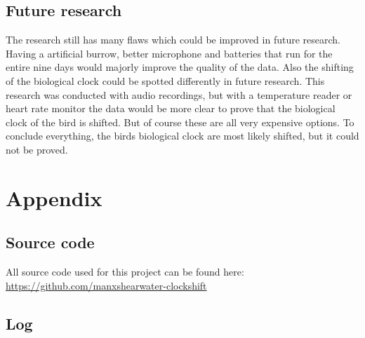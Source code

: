 \documentclass[a4paper]{article}
\begin{document}
    \subsection*{Future research}
        The research still has many flaws which could be improved in future research. Having a artificial burrow, better microphone and batteries that run for the entire nine days would majorly improve the quality of the data. Also the shifting of the biological clock could be spotted differently in future research. This research was conducted with audio recordings, but with a temperature reader or heart rate monitor the data would be more clear to prove that the biological clock of the bird is shifted. But of course these are all very expensive options. To conclude everything, the birds biological clock are most likely shifted, but it could not be proved.

\printbibliography


\section*{Appendix}

\subsection*{Source code}
All source code used for this project can be found here: \\
\url{https://github.com/manxshearwater-clockshift}

\newpage
{}
\subsection*{Log}
\end{document}
